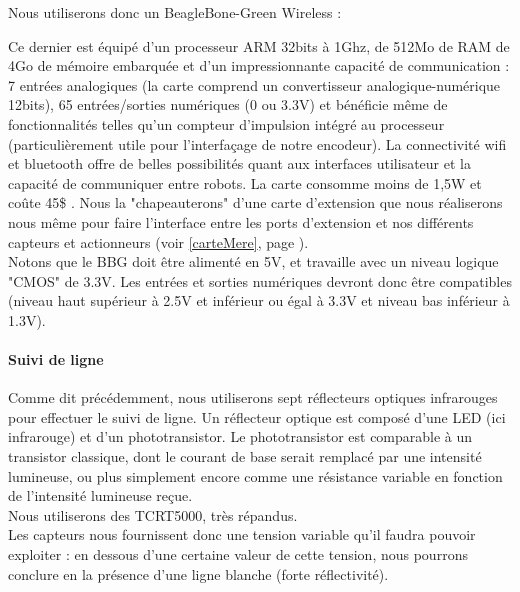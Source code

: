 			Nous utiliserons donc un BeagleBone-Green Wireless :

			Ce dernier est équipé d'un processeur ARM 32bits à 1Ghz, de 512Mo de RAM de 4Go de mémoire embarquée et d'un impressionnante capacité de communication : 7 entrées analogiques (la carte comprend un convertisseur analogique-numérique 12bits), 65 entrées/sorties numériques (0 ou 3.3V) et bénéficie même de fonctionnalités telles qu'un compteur d'impulsion intégré au processeur (particulièrement utile pour l'interfaçage de notre encodeur). La connectivité wifi et bluetooth offre de belles possibilités quant aux interfaces utilisateur et la capacité de communiquer entre robots. La carte consomme moins de 1,5W et coûte 45\$ \cite{bib6}.
			Nous la "chapeauterons" d'une carte d'extension que nous réaliserons nous même pour faire l'interface entre les ports d'extension et nos différents capteurs et actionneurs (voir \ref{carteMere}, page \pageref{carteMere}).\\

			Notons que le BBG doit être alimenté en 5V, et travaille avec un niveau logique "CMOS" de 3.3V. Les entrées et sorties numériques devront donc être compatibles (niveau haut supérieur à 2.5V et inférieur ou égal à 3.3V et niveau bas inférieur à 1.3V).

		\paragraph{Suivi de ligne}

			Comme dit précédemment, nous utiliserons sept réflecteurs optiques infrarouges pour effectuer le suivi de ligne.
			Un réflecteur optique est composé d'une LED  (ici infrarouge) et d'un phototransistor. Le phototransistor est comparable à un transistor classique, dont le courant de base serait remplacé par une intensité lumineuse, ou plus simplement encore comme une résistance variable en fonction de l'intensité lumineuse reçue.\\

			Nous utiliserons des TCRT5000, très répandus.\\

			Les capteurs nous fournissent donc une tension variable qu'il faudra pouvoir exploiter : en dessous d'une certaine valeur de cette tension, nous pourrons conclure en la présence d'une ligne blanche (forte réflectivité).\\

